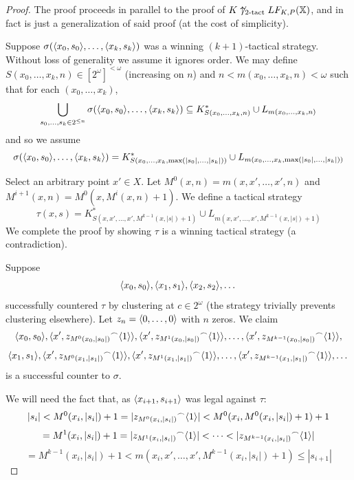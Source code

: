 \begin{proof}
The proof proceeds in parallel to the proof of $K\not\uparrow_{2\text{-tact}}LF_{K,P}(\mathbb{X})$, and in fact is just a generalization of said proof (at the cost of simplicity).

Suppose $\sigma(\langle x_0,s_0\rangle,\dots,\langle x_{k},s_{k}\rangle)$ was a winning $(k+1)$-tactical strategy. Without loss of generality we assume it ignores order. We may define $S(x_0,\dots,x_{k},n)\in [2^\omega]^{<\omega}$ (increasing on $n$) and $n<m(x_0,\dots,x_{k},n)<\omega$ such that for each $(x_0,\dots,x_{k})$,
  \[
    \bigcup_{s_0,\dots,s_k \in 2^{\leq n}} \sigma(\langle x_0,s_0\rangle,\dots,\langle x_{k},s_{k}\rangle) \subseteq 
    K^*_{S(x_0,\dots,x_{k},n)} \cup L_{m(x_0,\dots,x_{k},n)}
  \]
and so we assume
  \[
    \sigma(\langle x_0,s_0\rangle,\dots,\langle x_{k},s_{k}\rangle) =
    K^*_{S(x_0,\dots,x_{k},\max(|s_0|,\dots,|s_k|))} \cup L_{m(x_0,\dots,x_{k},\max(|s_0|,\dots,|s_k|))}
  \]

Select an arbitrary point $x' \in X$. Let $M^0(x,n)=m(x,x',\dots,x',n)$ and $M^{i+1}(x,n)=M^0(x,M^i(x,n)+1)$. We define a tactical strategy 
  \[
  \tau(x,s) = K^*_{S(x,x',\dots,x',M^{k-1}(x,|s|)+1)} \cup L_{m(x,x',\dots,x',M^{k-1}(x,|s|)+1)}
  \]
We complete the proof by showing $\tau$ is a winning tactical strategy (a contradiction).

Suppose
\[
\langle x_0, s_0\rangle, \langle x_1, s_1\rangle, \langle x_2, s_2\rangle, \dots
\]
successfully countered $\tau$ by clustering at $c\in 2^\omega$ (the strategy trivially prevents clustering elsewhere). Let $z_n = \langle0,\dots,0\rangle$ with $n$ zeros. We claim
\[
  \langle x_0, s_0\rangle, 
  \langle x', {z_{M^0(x_0,|s_0|)}}^\frown\langle1\rangle\rangle,
  \langle x', {z_{M^1(x_0,|s_0|)}}^\frown\langle1\rangle\rangle, 
  \dots, 
  \langle x', {z_{M^{k-1}(x_0,|s_0|)}}^\frown\langle1\rangle\rangle,
\]
\[
  \langle x_1, s_1\rangle, 
  \langle x', {z_{M^0(x_1,|s_1|)}}^\frown\langle1\rangle\rangle, 
  \langle x', {z_{M^1(x_1,|s_1|)}}^\frown\langle1\rangle\rangle, 
  \dots, 
  \langle x', {z_{M^{k-1}(x_1,|s_1|)}}^\frown\langle1\rangle\rangle, 
  \dots
\]
is a successful counter to $\sigma$.

We will need the fact that, as $\langle x_{i+1},s_{i+1}\rangle$ was legal against $\tau$:
  \[
    |s_i| <
    M^0(x_i,|s_i|)+1 =
    |{z_{M^0(x_i,|s_i|)}}^\frown\langle1\rangle| <
    M^0(x_i,M^0(x_i,|s_i|)+1)+1 
  \]
  \[
    =
    M^1(x_i,|s_i|)+1 =
    |{z_{M^1(x_i,|s_i|)}}^\frown\langle1\rangle| <
    \dots <
    |{z_{M^{k-1}(x_i,|s_i|)}}^\frown\langle1\rangle| 
  \]
  \[
    =
    M^{k-1}(x_i,|s_i|) + 1 <
    m(x_i,x',\dots,x',M^{k-1}(x_i,|s_i|)+1) \leq
    |s_{i+1}|
  \]


\end{proof}

